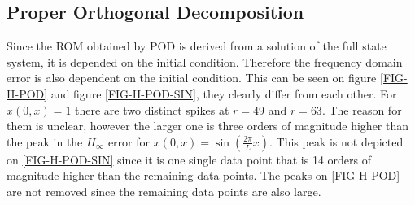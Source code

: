 \subsection{Proper Orthogonal Decomposition}
Since the ROM obtained by POD is derived from a solution of the full state system, it is depended on the initial condition.
Therefore the frequency domain error is also dependent on the initial condition.
This can be seen on figure \ref{FIG-H-POD} and figure \ref{FIG-H-POD-SIN}, they clearly differ from each other.
For \(x(0, x) = 1\) there are two distinct spikes at \(r=49\) and \(r=63\).
The reason for them is unclear, however the larger one is three orders of magnitude higher than the peak in the \(H_{\infty}\) error for $x(0, x) =  \sin(\frac{2\pi}{L}x)$.
This peak is not depicted on \ref{FIG-H-POD-SIN} since it is one single data point that is 14 orders of magnitude higher than the remaining data points.
The peaks on \ref{FIG-H-POD} are not removed since the remaining data points are also large.
